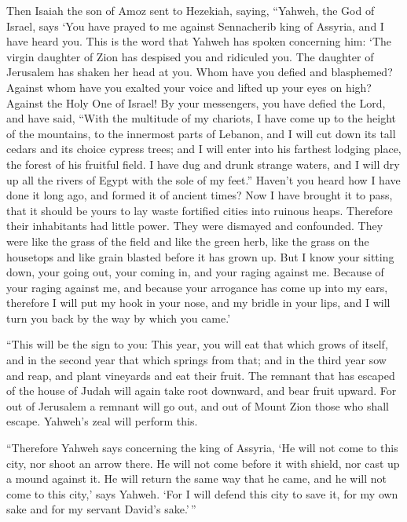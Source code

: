  Then Isaiah the son of Amoz sent to Hezekiah, saying,
``Yahweh, the God of Israel, says `You have prayed to me against
Sennacherib king of Assyria, and I have heard you.  This is
the word that Yahweh has spoken concerning him: `The virgin daughter of
Zion has despised you and ridiculed you. The daughter of Jerusalem has
shaken her head at you.  Whom have you defied and
blasphemed? Against whom have you exalted your voice and lifted up your
eyes on high? Against the Holy One of Israel!  By your
messengers, you have defied the Lord, and have said, ``With the
multitude of my chariots, I have come up to the height of the mountains,
to the innermost parts of Lebanon, and I will cut down its tall cedars
and its choice cypress trees; and I will enter into his farthest lodging
place, the forest of his fruitful field.  I have dug and
drunk strange waters, and I will dry up all the rivers of Egypt with the
sole of my feet.''  Haven't you heard how I have done it
long ago, and formed it of ancient times? Now I have brought it to pass,
that it should be yours to lay waste fortified cities into ruinous
heaps.  Therefore their inhabitants had little power. They
were dismayed and confounded. They were like the grass of the field and
like the green herb, like the grass on the housetops and like grain
blasted before it has grown up.  But I know your sitting
down, your going out, your coming in, and your raging against me.
 Because of your raging against me, and because your
arrogance has come up into my ears, therefore I will put my hook in your
nose, and my bridle in your lips, and I will turn you back by the way by
which you came.'

 ``This will be the sign to you: This year, you will eat
that which grows of itself, and in the second year that which springs
from that; and in the third year sow and reap, and plant vineyards and
eat their fruit.  The remnant that has escaped of the house
of Judah will again take root downward, and bear fruit upward.
 For out of Jerusalem a remnant will go out, and out of
Mount Zion those who shall escape. Yahweh's zeal will perform this.

 ``Therefore Yahweh says concerning the king of Assyria,
`He will not come to this city, nor shoot an arrow there. He will not
come before it with shield, nor cast up a mound against it.
 He will return the same way that he came, and he will not
come to this city,' says Yahweh.  `For I will defend this
city to save it, for my own sake and for my servant David's sake.'\,''

